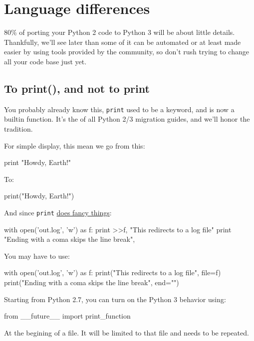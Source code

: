 
\chapter{Language differences}

80\% of porting your Python 2 code to Python 3 will be about little details. Thankfully, we'll see later than some of it can be automated or at least made easier by using tools provided by the community, so don't rush trying to change all your code base just yet.

\section{To print(), and not to print}

You probably already know this, \lstinline{print} used to be a \gls{keyword}, and is now a \gls{builtin} function. It's the  of all Python 2/3 migration guides, and we'll honor the tradition.

For simple display, this mean we go from this:

\begin{py2}
print "Howdy, Earth!"
\end{py2}

To:

\begin{py3}
print("Howdy, Earth!")
\end{py3}

And since \lstinline{print} \href{https://www.python.org/dev/peps/pep-0214/}{does fancy things}:

\begin{py2}
with open('out.log', 'w') as f:
    print >>f, "This redirects to a log file"
print "Ending with a coma skips the line break",
\end{py2}

You may have to use:

\begin{py3}
with open('out.log', 'w') as f:
    print("This redirects to a log file", file=f)
print("Ending with a coma skips the line break", end="")
\end{py3}

Starting from Python 2.7, you can turn on the Python 3 behavior using:

\begin{py2and3}
from __future__ import print_function
\end{py2and3}

At the begining of a file. It will be limited to that file and needs to be repeated.

